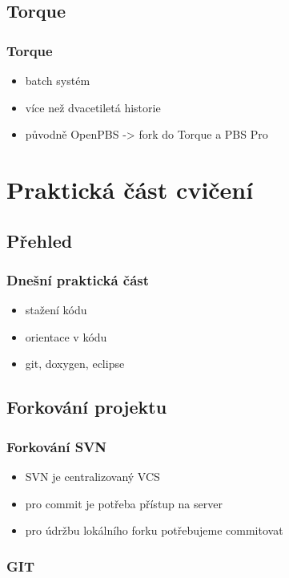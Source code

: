\subsection{Torque}

\begin{frame}
	\frametitle{Torque}
	\begin{itemize}
		\item{batch systém}
		\item{více než dvacetiletá historie}
		\item{původně OpenPBS -> fork do Torque a PBS Pro}
	\end{itemize}
\end{frame}

\section{Praktická část cvičení}
\subsection{Přehled}

\begin{frame}
	\frametitle{Dnešní praktická část}
	\begin{itemize}
		\item{stažení kódu}
		\item{orientace v kódu}
		\item{git, doxygen, eclipse}
	\end{itemize}
\end{frame}

\subsection{Forkování projektu}

\begin{frame}
	\frametitle{Forkování SVN}
	\begin{itemize}
		\item{SVN je centralizovaný VCS}
		\item{pro commit je potřeba přístup na server}
		\item{pro údržbu lokálního forku potřebujeme commitovat}
	\end{itemize}
\end{frame}

\begin{frame}
	\frametitle{GIT}
	\begin{itemize}
		\item{\url{http://git-scm.com}
		\item{\texttt{git svn clone --stdlayout URL}}
		\item{ukázka práce s GITem}
	\end{itemize}
\end{frame}

